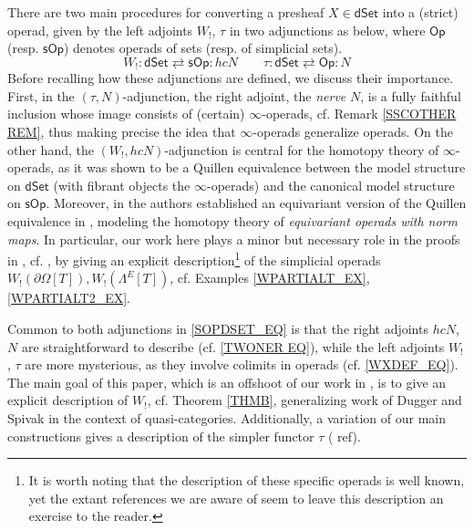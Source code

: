\documentclass[a4paper,10pt
,draft
]{article}%
\numberwithin{equation}{section}
\numberwithin{figure}{section}
\theoremstyle{definition} %
\newcommand{\Op}{\mathsf{Op}}%
\newcommand{\sOp}{\ensuremath{\mathsf{sOp}}}%
\newcommand{\dSet}{\mathsf{dSet}}
\newcommand{\1}{\ensuremath{\mathbbm 1}}%
\begin{document}
There are two main procedures for converting a presheaf
$X \in \mathsf{dSet}$
into a (strict) operad,
given by the left adjoints
$W_!$, $\tau$
in two adjunctions as below,
where $\Op$ (resp. $\sOp$) 
denotes operads of sets (resp. of simplicial sets).
\begin{equation}\label{SOPDSET_EQ}
	W_! \colon \dSet \rightleftarrows \sOp \colon h c N
	\qquad
	\tau \colon \dSet \rightleftarrows \Op \colon N
\end{equation}
Before recalling how these adjunctions are defined,
we discuss their importance. 
First, in the $(\tau,N)$-adjunction,
the right adjoint, the \emph{nerve} $N$,
is a fully faithful inclusion whose image consists of 
(certain) $\infty$-operads, 
cf. Remark \ref{SSCOTHER REM},
thus making precise the idea that 
$\infty$-operads generalize operads.
On the other hand, the $(W_!,hcN)$-adjunction
is central for the homotopy theory of $\infty$-operads,
as it was shown to be a Quillen equivalence \cite{CM13b}
between the model structure on $\dSet$ 
(with fibrant objects the $\infty$-operads)
and the canonical model structure on $\sOp$.
Moreover, in \cite{BP_TAS} the authors established an equivariant
version of the Quillen equivalence in \cite{CM13b},
modeling the homotopy theory of 
\emph{equivariant operads with norm maps}.
In particular, 
our work here plays a minor but necessary role in the proofs
in \cite{BP_TAS},
cf. \cite[Lemma \ref{TAS-WLEFTQPUSH LEM}]{BP_TAS},
by giving an explicit description\footnote{It is worth noting that the description of these specific operads is well known,
yet the extant references we are aware of seem to leave
this description an exercise to the reader.}
of the simplicial operads
$W_!(\partial \Omega[T]),W_!(\Lambda^E[T])$,
cf. Examples \ref{WPARTIALT_EX},\ref{WPARTIALT2_EX}.


Common to both adjunctions in \eqref{SOPDSET_EQ}
is that the right adjoints
$hcN$, $N$ are straightforward to describe
(cf. \eqref{TWONER EQ}), 
while the left adjoints $W_!$, $\tau$ are more mysterious,
as they involve colimits in operads (cf. \eqref{WXDEF_EQ}).
The main goal of this paper, 
which is an offshoot of our work in \cite{BP_TAS},
is to give an explicit description of $W_!$,
cf. Theorem \ref{THMB},
generalizing work of Dugger and Spivak \cite{DS11}
in the context of quasi-categories.
Additionally, a variation of our main constructions
gives a description of the simpler functor $\tau$
{(\color{red} ref)}.
\end{document}
